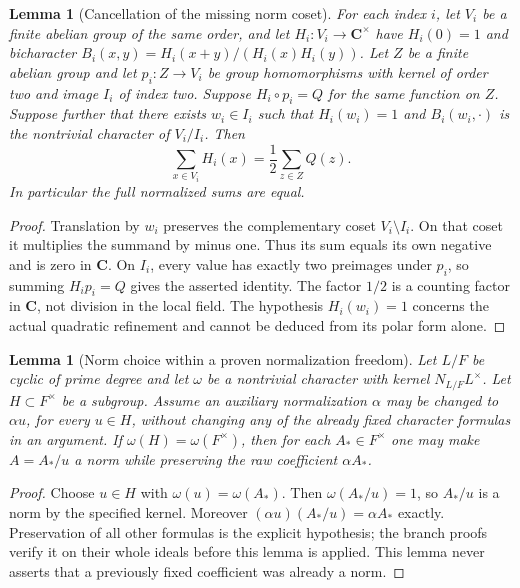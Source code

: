 \documentclass[11pt]{amsart}
\newtheorem{lemma}[theorem]{Lemma}
\theoremstyle{definition}
\theoremstyle{remark}
\begin{document}
\begin{lemma}[Cancellation of the missing norm coset]\label{U:missing-coset}
For each index $i$, let $V_i$ be a finite abelian group of the same order,
and let $H_i:V_i\to\mathbf C^\times$ have $H_i(0)=1$ and bicharacter
$B_i(x,y)=H_i(x+y)/(H_i(x)H_i(y))$.
Let $Z$ be a finite abelian group and let $p_i:Z\to V_i$ be group homomorphisms with kernel of order two and
image $I_i$ of index two. Suppose $H_i\circ p_i=Q$ for the same function
on $Z$. Suppose further that there exists $w_i\in I_i$ such that
$H_i(w_i)=1$ and $B_i(w_i,\cdot)$ is the nontrivial character of $V_i/I_i$.
Then
\[
 \sum_{x\in V_i}H_i(x)=\frac12\sum_{z\in Z}Q(z).
\]
In particular the full normalized sums are equal.
\end{lemma}
\begin{proof}
Translation by $w_i$ preserves the complementary coset $V_i\setminus I_i$.
On that coset it multiplies the summand by minus one. Thus its sum equals
its own negative and is zero in $\mathbf C$. On $I_i$, every value has
exactly two preimages under $p_i$, so summing $H_i p_i=Q$ gives the asserted
identity. The factor $1/2$ is a counting factor in $\mathbf C$, not division
in the local field. The hypothesis $H_i(w_i)=1$ concerns the actual
quadratic refinement and cannot be deduced from its polar form alone.
\end{proof}

\begin{lemma}[Norm choice within a proven normalization freedom]\label{U:normalization}
Let $L/F$ be cyclic of prime degree and let $\omega$ be a nontrivial
character with kernel $N_{L/F}L^\times$. Let $H\subset F^\times$ be a subgroup. Assume an auxiliary
normalization $\alpha$ may be changed to $\alpha u$, for every $u\in H$,
without changing any of the already fixed character formulas in an
argument. If $\omega(H)=\omega(F^\times)$, then for each $A_*\in F^\times$
one may make $A=A_*/u$ a norm while preserving the raw coefficient
$\alpha A_*$.
\end{lemma}
\begin{proof}
Choose $u\in H$ with $\omega(u)=\omega(A_*)$. Then $\omega(A_*/u)=1$,
so $A_*/u$ is a norm by the specified kernel. Moreover
$(\alpha u)(A_*/u)=\alpha A_*$ exactly. Preservation of all other formulas
is the explicit hypothesis; the branch proofs verify it on their whole
ideals before this lemma is applied. This lemma never asserts that a
previously fixed coefficient was already a norm.
\end{proof}
\end{document}
